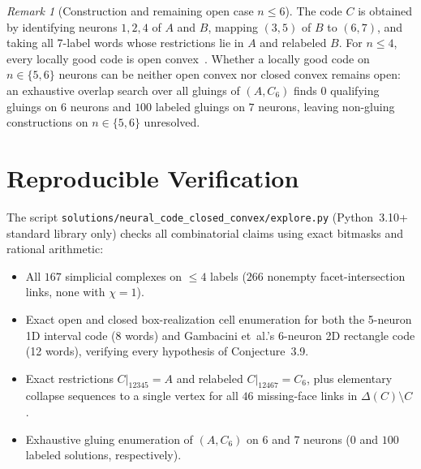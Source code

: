 \documentclass[11pt]{article}
\theoremstyle{plain}
\theoremstyle{definition}
\theoremstyle{remark}
\newtheorem{remark}{Remark}
\begin{document}
\begin{remark}[Construction and remaining open case $n \le 6$]
The code $C$ is obtained by identifying neurons $1, 2, 4$ of $A$ and $B$, mapping $(3, 5)$ of $B$ to $(6, 7)$, and taking all 7-label words whose restrictions lie in $A$ and relabeled $B$. For $n \le 4$, every locally good code is open convex~\cite{curto2017}. Whether a locally good code on $n \in \{5, 6\}$ neurons can be neither open convex nor closed convex remains open: an exhaustive overlap search over all gluings of $(A, C_6)$ finds $0$ qualifying gluings on $6$ neurons and $100$ labeled gluings on $7$ neurons, leaving non-gluing constructions on $n \in \{5, 6\}$ unresolved.
\end{remark}

\section{Reproducible Verification}

The script \texttt{solutions/neural\_code\_closed\_convex/explore.py} (Python~3.10+ standard library only) checks all combinatorial claims using exact bitmasks and rational arithmetic:
\begin{itemize}[leftmargin=2em,itemsep=1pt]
\item All $167$ simplicial complexes on $\le 4$ labels ($266$ nonempty facet-intersection links, none with $\chi = 1$).
\item Exact open and closed box-realization cell enumeration for both the 5-neuron 1D interval code (8 words) and Gambacini et~al.'s 6-neuron 2D rectangle code (12 words), verifying every hypothesis of Conjecture~3.9.
\item Exact restrictions $C|_{12345} = A$ and relabeled $C|_{12467} = C_6$, plus elementary collapse sequences to a single vertex for all $46$ missing-face links in $\Delta(C) \setminus C$.
\item Exhaustive gluing enumeration of $(A, C_6)$ on $6$ and $7$ neurons ($0$ and $100$ labeled solutions, respectively).
\end{itemize}
\end{document}
